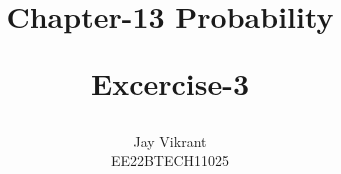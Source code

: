\documentclass[journal,12pt,twocolumn]{IEEEtran}
\theoremstyle{remark}
\begin{document}
%




\vspace{3cm}

\title{
Chapter-13 Probability 

\large{Excercise-3}
}
\author{Jay Vikrant

EE22BTECH11025
}	


%
%
%

% 
%



% 
\end{document}
